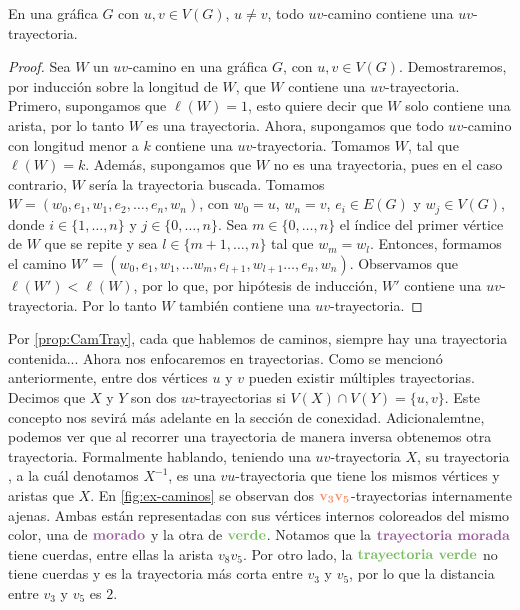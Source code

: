     \begin{proposicion}
    \label{prop:CamTray}
        En una gr\'afica $G$ con $u, v \in V(G)$, $u \ne v$, todo $uv$-camino
        contiene una $uv$-trayectoria.
    \end{proposicion}


    \begin{proof}
        Sea $W$ un $uv$-camino en una gr\'afica $G$, con $u,v \in V(G)$.
        Demostraremos, por inducci\'on sobre la longitud de $W$, que $W$
        contiene una $uv$-trayectoria. Primero, supongamos que $\ell(W)=1$, esto
        quiere decir que $W$ solo contiene una arista, por lo tanto $W$ es una
        trayectoria. Ahora, supongamos que todo $uv$-camino con longitud menor a
        $k$ contiene una $uv$-trayectoria. Tomamos $W$, tal que $\ell(W) = k$.
        Adem\'as, supongamos que $W$ no es una trayectoria, pues en el caso
        contrario, $W$ ser\'ia la trayectoria buscada. Tomamos $W=
        (w_0,e_1,w_1,e_2, \dots, e_n,w_n)$, con $w_0=u$, $w_n=v$, $e_i \in E(G)$
        y $w_j \in V(G)$, donde $i \in \{1, \dots, n\}$ y $j \in \{0, \dots,
        n\}$. Sea $m \in \{0, \dots, n\}$ el \'indice del primer v\'ertice de
        $W$ que se repite y sea $l \in \{m+1, \dots, n\}$ tal que $w_m = w_l$.
        Entonces, formamos el camino $W'= (w_0,e_1,w_1,\dots w_m, e_{l+1},
        w_{l+1} \dots, e_n,w_n)$. Observamos que $\ell(W')<\ell(W)$, por lo que,
        por hip\'otesis de inducci\'on, $W'$ contiene una $uv$-trayectoria. Por
        lo tanto $W$ tambi\'en contiene una $uv$-trayectoria.
    \end{proof}
    
    Por \cref{prop:CamTray}, cada que hablemos de caminos, siempre hay una
   trayectoria contenida... Ahora nos enfocaremos en trayectorias. Como se
   mencion\'o anteriormente, entre dos v\'ertices $u$ y $v$ pueden existir
   m\'ultiples trayectorias. Decimos que $X$ y $Y$ son dos $uv$-trayectorias
    si $V(X)\cap V(Y)=\{u,v\}$.
   Este concepto nos sevir\'a m\'as adelante en la secci\'on de conexidad.
   Adicionalemtne, podemos ver que al recorrer una trayectoria de manera inversa
   obtenemos otra trayectoria. Formalmente hablando, teniendo una
   $uv$-trayectoria $X$, su trayectoria , a la
   cu\'al denotamos $X^{-1}$, es una $vu$-trayectoria que tiene los mismos
   v\'ertices y aristas que $X$. En \cref{fig:ex-caminos} se observan dos
   ${\color{coral}\bf v_3 v_5}$-trayectorias internamente ajenas. Ambas est\'an
   representadas con sus v\'ertices internos coloreados del mismo color, una de
   ${\color{morado}\bf morado}$ y la otra de ${\color{verde}\bf verde}$. Notamos
   que la ${\color{morado}\textbf{trayectoria morada}}$ tiene cuerdas, entre
   ellas la arista $v_8v_5$. Por otro lado, la
   ${\color{verde}\textbf{trayectoria verde}}$ no tiene cuerdas y es la
   trayectoria m\'as corta entre $v_3$ y $v_5$, por lo que la distancia entre
   $v_3$ y $v_5$ es $2$.

